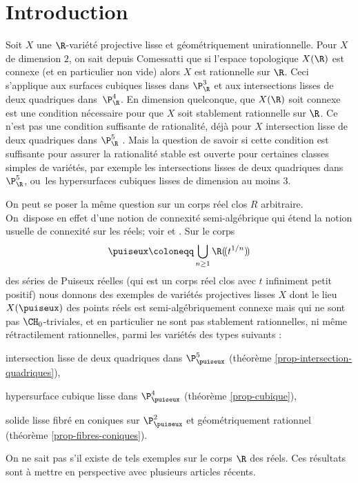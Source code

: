 \section*{Introduction}

Soit $X$ une $\R$-variété projective lisse et géométriquement unirationnelle.
Pour $X$ de dimension $2$, on sait depuis Comessatti \cite{comessatti1912fondamenti} que si l'espace topologique $X(\R)$ est connexe (et en particulier non vide) alors $X$ est rationnelle sur $\R$. Ceci s'applique aux surfaces cubiques lisses dans $\P^3_{\R} $ et aux intersections lisses
de deux quadriques dans~$\P^4_{\R}$.
En dimension quelconque, que $X(\R)$ soit connexe
est une condition nécessaire pour que $X$ soit stablement rationnelle sur $\R$.
Ce n'est pas une condition suffisante de rationalité, déjà pour $X$
intersection lisse de deux quadriques dans $\P^5_\R$
\cite{hassett2021rationality}.
Mais la question de savoir si cette condition est suffisante pour assurer la rationalité stable est ouverte pour
certaines classes simples de variétés, par exemple les intersections lisses de deux quadriques dans $\P^5_\R$, ou~les hypersurfaces cubiques lisses de dimension au moins $3$.

On peut se poser la même question sur un corps réel clos $R$ arbitraire. On~dispose en effet d'une notion de connexité semi-algébrique qui étend la notion usuelle de connexité sur les réels; voir \cite{delfs1981semialgebraicI} et \cite[Def.\,2.4.2]{bochnak1998real}. Sur le corps \[\puiseux\coloneqq \bigcup_{n\geq1} \R(\!(t^{1/n})\!)\]
des séries de Puiseux réelles (qui est un corps réel clos avec $t$ infiniment petit positif) nous donnons des exemples
de variétés projectives lisses $X$ dont le lieu $X(\puiseux)$ des points réels est
semi-algébriquement connexe mais qui ne sont pas
$\CH_{0}$-triviales, et en particulier ne sont pas stablement rationnelles,
ni même rétractilement rationnelles, parmi les variétés des types suivants :

\begin{enumeratei}
\item\label{enum:i}
intersection lisse de deux quadriques dans $\P^5_{\puiseux}$ (théorème \ref{prop-intersection-quadriques}),
\item\label{enum:ii}
hypersurface cubique lisse dans $\P^4_{\puiseux}$ (théorème \ref{prop-cubique}),
\item\label{enum:iii}
solide lisse fibré en coniques sur $ \P^2_{\puiseux}$ et géométriquement rationnel (théorème \ref{prop-fibres-coniques}).
\end{enumeratei}
On ne sait pas s'il existe de tels exemples sur le corps $\R$ des réels.
Ces résultats sont à mettre en perspective avec plusieurs articles récents.

